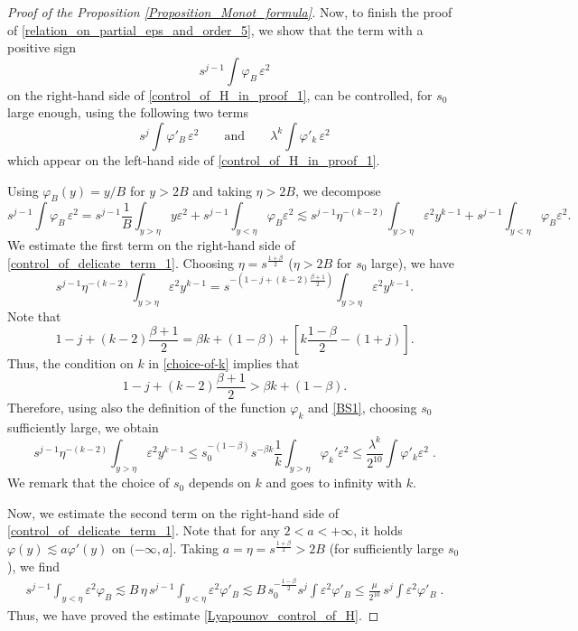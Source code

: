 \documentclass[16pt,english, oneside,reqno]{smfart}
\newcommand{\vare}{{\varepsilon}}
\newcommand{\vphi}{{\varphi}}
\begin{document}
\begin{proof}[Proof of the Proposition \ref{Proposition_Monot_formula}]
Now, to finish the proof of \eqref{relation_on_partial_eps_and_order_5}, 
we show that the term with a positive sign
$$ s^{j-1} \int \vphi_B\,\vare^2$$
on the right-hand side of \eqref{control_of_H_in_proof_1},
can be controlled, for $s_0$ large enough, using the following two terms
$$   s^j\int\vphi'_B\,\vare^2 \qquad \text{and} \qquad \lambda^k\int \vphi'_k \,\vare^2 $$
which appear on the left-hand side of \eqref{control_of_H_in_proof_1}.

Using $\varphi_B(y)=y/B$ for $y>2B$ and taking $\eta>2B$, we decompose
\begin{equation}\label{control_of_delicate_term_1}
        s^{j-1} \int \vphi_B\,\vare^2 
        =s^{j-1}\frac 1B \int_{y>\eta} y \vare^2  + s^{j-1}\int_{y<\eta} \vphi_B \vare^2
        \lesssim s^{j-1} \eta^{-(k-2)}\int_{y>\eta} \vare^2 y^{k-1} + s^{j-1}\int_{y<\eta} \vphi_B  \vare^2 .
\end{equation}
We estimate the first term on the right-hand side of \eqref{control_of_delicate_term_1}.
Choosing $\eta = s^{\frac{1+\beta}2}$ ($\eta>2B$ for $s_0$ large), we have
\begin{equation}
    s^{j-1} \eta^{-(k-2)}\int_{y>\eta} \vare^2 y^{k-1} 
    = s^{-(1-j+(k-2)\frac{\beta+1}{2})}\int_{y>\eta} \vare^2 y^{k-1} .
\end{equation}
Note that
\begin{equation}
     1-j+(k-2)\frac{\beta+1}{2}  
     = \beta k + (1-\beta)
     +\left[ k \frac{1-\beta}{2}- (1+j)\right].
\end{equation}
Thus, the condition on $k$ in \eqref{choice-of-k} implies that
\begin{equation}
     1-j+(k-2)\frac{\beta+1}{2}  
     > \beta k + (1-\beta ) .
\end{equation}
Therefore, using also the definition of the function $\vphi_k$
and \eqref{BS1}, choosing $s_0$ sufficiently large, we obtain
\begin{equation}
    s^{j-1} \eta^{-(k-2)}\int_{y>\eta} \vare^2 y^{k-1} 
    \leq   s_0^{- (1-\beta)} s^{-\beta k} \frac 1k \int_{y>\eta} \varphi_k' \vare^2 
    \leq \frac{\lambda^k}{2^{10}}\int \vphi'_k \vare^2  \;.
\end{equation}
We remark that the choice of $s_0$ depends on $k$ and goes to infinity with $k$.

\vspace{0.15cm}
Now, we estimate the second term on the right-hand side of \eqref{control_of_delicate_term_1}.
Note that for any $2<a<+\infty$, it holds $\vphi(y) \lesssim a \vphi'(y)$ on $(-\infty,a]$. Taking $a = \eta=s^{\frac{1+\beta}2}>2B$ (for sufficiently large $s_0$), we find
\begin{equation}
    \begin{split}
        s^{j-1}\int_{y<\eta}\vare^2\vphi_B \lesssim B\, \eta\, s^{j-1} \int_{y<\eta}\vare^2\vphi'_B \lesssim B\, s_0^{-\frac{1-\beta}{2}}s^j \int \vare^2 \vphi'_B \leq \frac{\mu}{2^{10}}\, s^j \int\vare^2 \vphi'_B \;.
    \end{split}
\end{equation}
Thus, we have proved the estimate \eqref{Lyapounov_control_of_H}.


\end{proof}
\end{document}
